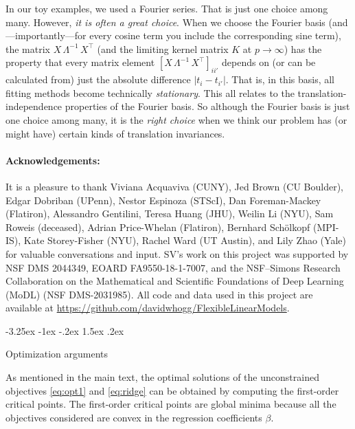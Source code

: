 \documentclass[12pt,letterpaper]{article}
\makeatletter
\renewcommand\section{\@startsection {section}{1}{\z@}%
  {-3.25ex \@plus -1ex \@minus -.2ex}%
  {1.5ex \@plus .2ex}%
  {\raggedright\normalfont\large\bfseries}}
\makeatother
\begin{document}
In our toy examples, we used a Fourier series.
That is just one choice among many.
However, \emph{it is often a great choice}.
When we choose the Fourier basis (and---importantly---for every cosine term you include the corresponding sine term), the matrix $X\,\Lambda^{-1}\,X^\top$ (and the limiting kernel matrix $K$ at $p\to\infty$) has the property that every matrix element $[X\,\Lambda^{-1}\,X^\top]_{ii'}$ depends on (or can be calculated from) just the absolute difference $|t_i-t_{i'}|$.
That is, in this basis, all fitting methods become technically \emph{stationary}.
This all relates to the translation-independence properties of the Fourier basis.
So although the Fourier basis is just one choice among many, it is the \emph{right choice} when we think our problem has (or might have) certain kinds of translation invariances.

\paragraph{Acknowledgements:}
It is a pleasure to thank
Viviana Acquaviva (CUNY),
Jed Brown (CU Boulder),
Edgar Dobriban (UPenn),
Nestor Espinoza (STScI),
Dan Foreman-Mackey (Flatiron),
Alessandro Gentilini,
Teresa Huang (JHU),
Weilin Li (NYU),
Sam Roweis (deceased),
Adrian Price-Whelan (Flatiron),
Bernhard Sch\"olkopf (MPI-IS),
Kate Storey-Fisher (NYU),
Rachel Ward (UT Austin), and
Lily Zhao (Yale)
for valuable conversations and input.
SV's work on this project was supported by NSF DMS 2044349, EOARD FA9550-18-1-7007, and the NSF--Simons Research Collaboration on the Mathematical and Scientific Foundations of Deep Learning (MoDL) (NSF DMS-2031985).
All code and data used in this project are available at
\url{https://github.com/davidwhogg/FlexibleLinearModels}.

\appendix
\section{Optimization arguments}\label{app:math}

As mentioned in the main text, the optimal solutions of the unconstrained objectives \eqref{eq:opt1} and \eqref{eq:ridge} can be obtained by computing the first-order critical points. The first-order critical points are global minima because all the objectives considered are convex in the regression coefficients $\beta$.
\end{document}
